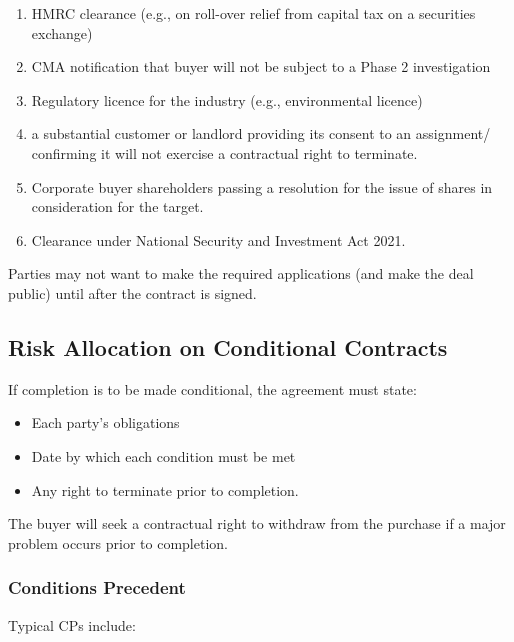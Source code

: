 \documentclass[
]{article}
\providecommand{\tightlist}{%
  \setlength{\itemsep}{0pt}\setlength{\parskip}{0pt}}
\begin{document}
\begin{enumerate}
\tightlist
\item
  HMRC clearance (e.g., on roll-over relief from capital tax on a
  securities exchange)
\item
  CMA notification that buyer will not be subject to a Phase 2
  investigation
\item
  Regulatory licence for the industry (e.g., environmental licence)
\item
  a substantial customer or landlord providing its consent to an
  assignment/ confirming it will not exercise a contractual right to
  terminate.
\item
  Corporate buyer shareholders passing a resolution for the issue of
  shares in consideration for the target.
\item
  Clearance under National Security and Investment Act 2021.
\end{enumerate}

Parties may not want to make the required applications (and make the
deal public) until after the contract is signed.

\hypertarget{risk-allocation-on-conditional-contracts}{%
\subsection{Risk Allocation on Conditional
Contracts}\label{risk-allocation-on-conditional-contracts}}

If completion is to be made conditional, the agreement must state:

\begin{itemize}
\tightlist
\item
  Each party's obligations
\item
  Date by which each condition must be met
\item
  Any right to terminate prior to completion.
\end{itemize}

The buyer will seek a contractual right to withdraw from the purchase if
a major problem occurs prior to completion.

\hypertarget{conditions-precedent-1}{%
\subsubsection{Conditions Precedent}\label{conditions-precedent-1}}

Typical CPs include:
\end{document}
